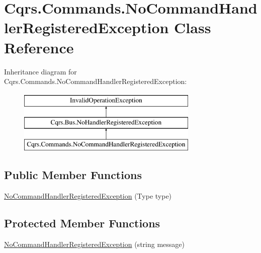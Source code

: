 \hypertarget{classCqrs_1_1Commands_1_1NoCommandHandlerRegisteredException}{}\section{Cqrs.\+Commands.\+No\+Command\+Handler\+Registered\+Exception Class Reference}
\label{classCqrs_1_1Commands_1_1NoCommandHandlerRegisteredException}
Inheritance diagram for Cqrs.\+Commands.\+No\+Command\+Handler\+Registered\+Exception\+:\begin{figure}[H]
\begin{center}
\leavevmode
\includegraphics[height=3.000000cm]{classCqrs_1_1Commands_1_1NoCommandHandlerRegisteredException}
\end{center}
\end{figure}
\subsection*{Public Member Functions}
\begin{DoxyCompactItemize}
\item 
\hyperlink{classCqrs_1_1Commands_1_1NoCommandHandlerRegisteredException_a7b6f2d7fd69a4369e12eba36598e1055_a7b6f2d7fd69a4369e12eba36598e1055}{No\+Command\+Handler\+Registered\+Exception} (Type type)
\end{DoxyCompactItemize}
\subsection*{Protected Member Functions}
\begin{DoxyCompactItemize}
\item 
\hyperlink{classCqrs_1_1Commands_1_1NoCommandHandlerRegisteredException_a4adad818f3b1a908cd2f9d7e34aad627_a4adad818f3b1a908cd2f9d7e34aad627}{No\+Command\+Handler\+Registered\+Exception} (string message)
\end{DoxyCompactItemize}


